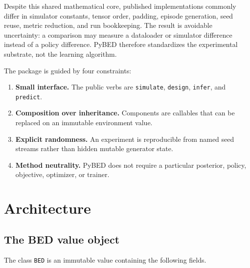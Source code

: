 \documentclass[11pt]{article}
\begin{document}
Despite this shared mathematical core, published implementations commonly differ in
simulator constants, tensor order, padding, episode generation, seed reuse, metric
reduction, and run bookkeeping. The result is avoidable uncertainty: a comparison may
measure a dataloader or simulator difference instead of a policy difference. PyBED
therefore standardizes the experimental substrate, not the learning algorithm.

The package is guided by four constraints:
\begin{enumerate}
  \item \textbf{Small interface.} The public verbs are \texttt{simulate},
  \texttt{design}, \texttt{infer}, and \texttt{predict}.
  \item \textbf{Composition over inheritance.} Components are callables that can be
  replaced on an immutable environment value.
  \item \textbf{Explicit randomness.} An experiment is reproducible from named seed
  streams rather than hidden mutable generator state.
  \item \textbf{Method neutrality.} PyBED does not require a particular posterior,
  policy, objective, optimizer, or trainer.
\end{enumerate}

\section{Architecture}

\subsection{The BED value object}

The class \texttt{BED} is an immutable value containing the following fields.
\end{document}

